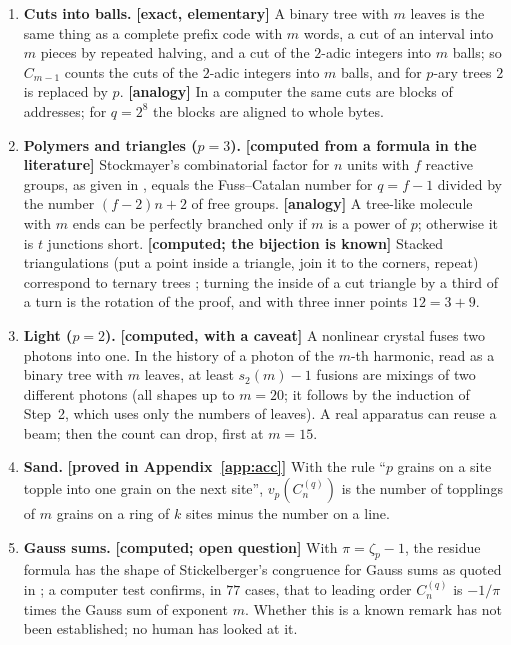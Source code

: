\documentclass[11pt]{article}
\theoremstyle{definition}
\theoremstyle{remark}
\numberwithin{equation}{section}
\numberwithin{figure}{section}
\begin{document}
\begin{enumerate}[leftmargin=1.6em,itemsep=3pt]
\item \textbf{Cuts into balls.} \textbf{[exact, elementary]} A binary tree with $m$ leaves is the same thing
as a complete prefix code with $m$ words, a cut of an interval into $m$ pieces by repeated halving, and a cut
of the $2$-adic integers into $m$ balls; so $C_{m-1}$ counts the cuts of the $2$-adic integers into $m$ balls,
and for $p$-ary trees $2$ is replaced by $p$. \textbf{[analogy]} In a computer the same cuts are blocks of
addresses; for $q=2^8$ the blocks are aligned to whole bytes.

\item \textbf{Polymers and triangles ($p=3$).} \textbf{[computed from a formula in the literature]}
Stockmayer's combinatorial factor for $n$ units with $f$ reactive groups, as given in \cite{Tanaka}, equals
the Fuss--Catalan number for $q=f-1$ divided by the number $(f-2)n+2$ of free groups. \textbf{[analogy]} A
tree-like molecule with $m$ ends can be perfectly branched only if $m$ is a power of $p$; otherwise it is $t$
junctions short. \textbf{[computed; the bijection is known]} Stacked triangulations (put a point inside a
triangle, join it to the corners, repeat) correspond to ternary trees \cite{AlbenqueMarckert}; turning the
inside of a cut triangle by a third of a turn is the rotation of the proof, and with three inner points
$12=3+9$.

\item \textbf{Light ($p=2$).} \textbf{[computed, with a caveat]} A nonlinear crystal fuses two photons into
one. In the history of a photon of the $m$-th harmonic, read as a binary tree with $m$ leaves, at least
$s_2(m)-1$ fusions are mixings of two different photons (all shapes up to $m=20$; it follows by the induction of Step~2, which uses only the numbers of leaves). A real
apparatus can reuse a beam; then the count can drop, first at $m=15$.

\item \textbf{Sand.} \textbf{[proved in Appendix~\ref{app:acc}]} With the rule ``$p$ grains on a site topple
into one grain on the next site'', $v_p(C_n^{(q)})$ is the number of topplings of $m$ grains on a ring of $k$
sites minus the number on a line.

\item \textbf{Gauss sums.} \textbf{[computed; open question]} With $\pi=\zeta_p-1$, the residue formula has
the shape of Stickelberger's congruence for Gauss sums as quoted in \cite{Blache}; a computer test confirms,
in $77$ cases, that to leading order $C_n^{(q)}$ is $-1/\pi$ times the Gauss sum of exponent $m$. Whether this
is a known remark has not been established; no human has looked at it.
\end{enumerate}
\end{document}
